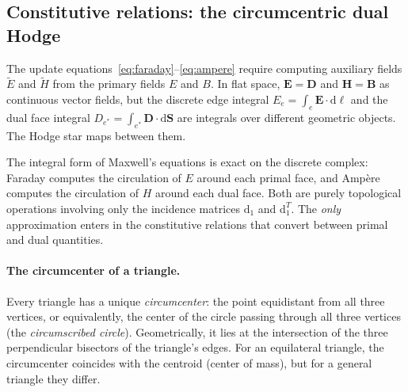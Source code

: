 \documentclass[11pt,a4paper]{article}
\newcommand{\dd}{\mathrm{d}}
\begin{document}
\subsection{Constitutive relations: the circumcentric dual Hodge}
\label{sec:hodge}

The update equations~\eqref{eq:faraday}--\eqref{eq:ampere} require computing
auxiliary fields $\widetilde{E}$ and $\widetilde{H}$ from the primary fields
$E$ and $B$. In flat space, $\bm{E} = \bm{D}$ and $\bm{H} = \bm{B}$ as
continuous vector fields, but the discrete edge integral $E_e = \int_e
\bm{E}\cdot\dd\bm{\ell}$ and the dual face integral $D_{e^*} = \int_{e^*}
\bm{D}\cdot\dd\bm{S}$ are integrals over different geometric objects. The
Hodge star maps between them.

The integral form of Maxwell's equations is exact on the discrete complex:
Faraday computes the circulation of $E$ around each primal face, and Amp\`ere
computes the circulation of $H$ around each dual face. Both are purely
topological operations involving only the incidence matrices $\dd_1$ and
$\dd_1^T$. The \emph{only} approximation enters in the constitutive
relations that convert between primal and dual quantities.

\paragraph{The circumcenter of a triangle.}
Every triangle has a unique \emph{circumcenter}: the point equidistant from all
three vertices, or equivalently, the center of the circle passing through all
three vertices (the \emph{circumscribed circle}). Geometrically, it lies at the
intersection of the three perpendicular bisectors of the triangle's edges. For
an equilateral triangle, the circumcenter coincides with the centroid (center of
mass), but for a general triangle they differ.
\end{document}
